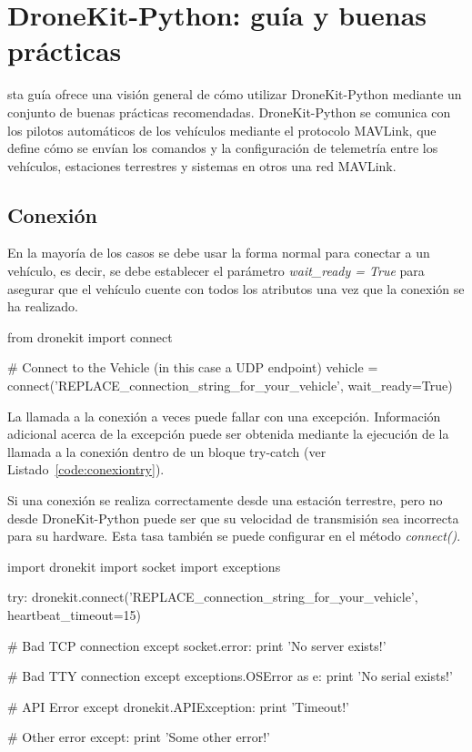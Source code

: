 \chapter{DroneKit-Python: guía y buenas prácticas}
\label{chap:dronekitguia}

sta guía ofrece una visión general de cómo utilizar DroneKit-Python mediante un conjunto de buenas prácticas recomendadas. DroneKit-Python se comunica con los pilotos automáticos de los vehículos mediante el protocolo MAVLink, que define cómo se envían los comandos y la configuración de telemetría entre los vehículos, estaciones terrestres y sistemas en otros una red MAVLink.

\section{Conexión}

En la mayoría de los casos se debe usar la forma normal para conectar a un vehículo, es decir, se debe establecer el parámetro \textit{wait\_ready = True} para asegurar que el vehículo cuente con todos los atributos una vez que la conexión se ha realizado.

\begin{listing}[
 float=h!,
 language = Python,
 caption = {Conexión con el vehículo mediante DroneKit-Python},
 label  = code:conexion]
from dronekit import connect

# Connect to the Vehicle (in this case a UDP endpoint)
vehicle = connect('REPLACE_connection_string_for_your_vehicle', wait_ready=True)
\end{listing}

La llamada a la conexión a veces puede fallar con una excepción. Información adicional acerca de la excepción puede ser obtenida mediante la ejecución de la llamada a la conexión dentro de un bloque try-catch (ver Listado~\ref{code:conexiontry}).

Si una conexión se realiza correctamente desde una estación terrestre, pero no desde DroneKit-Python puede ser que su velocidad de transmisión sea incorrecta para su hardware. Esta tasa también se puede configurar en el método \textit{connect()}.

\clearpage

\begin{listing}[
 float=h!,
 language = Python,
 caption = {Conexión haciendo uso de try-catch},
 label  = code:conexiontry]
import dronekit
import socket
import exceptions

try:
    dronekit.connect('REPLACE_connection_string_for_your_vehicle', heartbeat_timeout=15)

# Bad TCP connection
except socket.error:
    print 'No server exists!'

# Bad TTY connection
except exceptions.OSError as e:
    print 'No serial exists!'

# API Error
except dronekit.APIException:
    print 'Timeout!'

# Other error
except:
    print 'Some other error!'
\end{listing}

